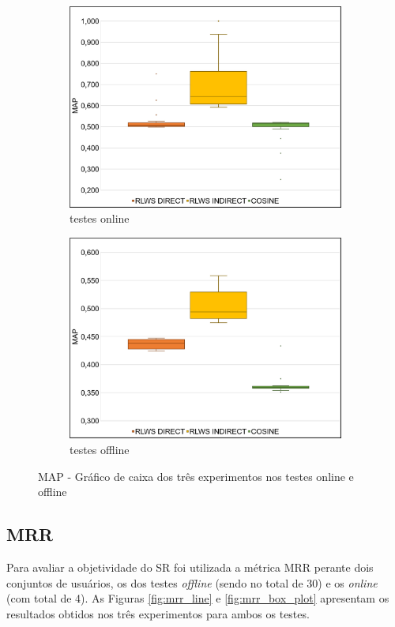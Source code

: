 \begin{figure}
    \begin{subfigure}{.5\textwidth}
        \centering
        \includegraphics[width=.8\linewidth]{imagens/map_box_plot_online.jpg}
        \caption{testes online}
        \label{fig:map_box_plot_a}
    \end{subfigure}%
    \begin{subfigure}{.5\textwidth}
        \centering
        \includegraphics[width=.8\linewidth]{imagens/map_box_plot_offline.jpg}
        \caption{testes offline}
        \label{fig:map_box_plot_b}
    \end{subfigure}
    \caption{MAP - Gráfico de caixa dos três experimentos nos testes online e offline}
    \label{fig:map_box_plot}
\end{figure}

\subsection{MRR}

Para avaliar a objetividade do \ac{SR} foi utilizada a métrica \ac{MRR} perante dois conjuntos de usuários, os dos testes \textit{offline} (sendo no total de 30) e os \textit{online} (com total de 4). As Figuras \ref{fig:mrr_line} e \ref{fig:mrr_box_plot} apresentam os resultados obtidos nos três experimentos para ambos os testes. 

